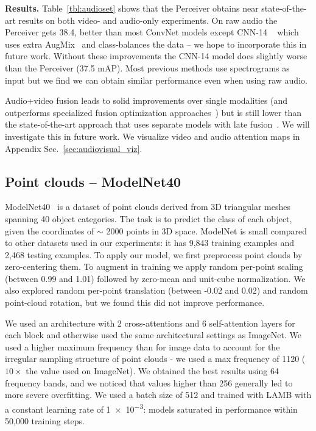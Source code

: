  \textbf{Results.} Table~\ref{tbl:audioset} shows that the Perceiver obtains near state-of-the-art results on both video- and audio-only experiments. On raw audio the Perceiver gets 38.4, better than most ConvNet models except CNN-14 ~\cite{kong2020panns}  which uses extra   AugMix~\cite{hendrycks2019augmix} and class-balances the data -- we hope to incorporate this in future work. Without these improvements the CNN-14 model does slightly worse than the Perceiver (37.5 mAP). Most previous methods use spectrograms as input but we find we can obtain similar performance even when using raw audio.

Audio+video fusion leads to solid improvements over single modalities (and outperforms specialized fusion optimization approaches~\cite{wang2020makes}) but is still lower than the state-of-the-art approach that uses separate models with late fusion~\cite{fayek2020large}. We will investigate this in future work. We visualize video and audio attention maps in Appendix Sec.~\ref{sec:audiovisual_viz}.

\subsection{Point clouds -- ModelNet40}

ModelNet40~\cite{wu20153d} is a dataset of point clouds derived from 3D triangular meshes spanning 40 object categories. The task is to predict the class of each object, given the coordinates of $\sim$ 2000 points in 3D space. ModelNet is small compared to other datasets used in our experiments: it has 9,843 training examples and 2,468 testing examples. To apply our model, we first preprocess point clouds by zero-centering them. To augment in training we apply random per-point scaling (between 0.99 and 1.01) followed by zero-mean and unit-cube normalization. We also explored random per-point translation (between -0.02 and 0.02) and random point-cloud rotation, but we found this did not improve performance.

We used an architecture with 2 cross-attentions and 6 self-attention layers for each block and otherwise used the same architectural settings as ImageNet.  We used a higher maximum frequency than for image data to account for the irregular sampling structure of point clouds - we used a max frequency of 1120 ($10\times$ the value used on ImageNet). We obtained the best results using 64 frequency bands, and we noticed that values higher than 256 generally led to more severe overfitting. We used a batch size of 512 and trained with LAMB with a constant learning rate of \num{1e-3}: models saturated in performance within 50,000 training steps.

